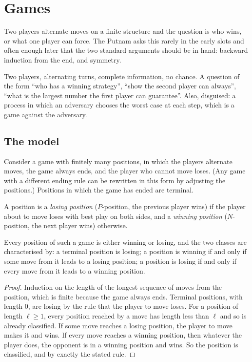 \section{Games}
\label{sec:games}

Two players alternate moves on a finite structure and the question is who wins, or what one player can force. The Putnam asks this rarely in the early slots and often enough later that the two standard arguments should be in hand: backward induction from the end, and symmetry.

\begin{recognise}
Two players, alternating turns, complete information, no chance. A question of the form ``who has a winning strategy'', ``show the second player can always'', ``what is the largest number the first player can guarantee''. Also, disguised: a process in which an adversary chooses the worst case at each step, which is a game against the adversary.
\end{recognise}

\subsection*{The model}

Consider a game with finitely many positions, in which the players alternate moves, the game always ends, and the player who cannot move loses. (Any game with a different ending rule can be rewritten in this form by adjusting the positions.) Positions in which the game has ended are terminal.

\begin{definition}
A position is a \emph{losing position} ($P$-position, the previous player wins) if the player about to move loses with best play on both sides, and a \emph{winning position} ($N$-position, the next player wins) otherwise.
\end{definition}

\begin{theorem}
Every position of such a game is either winning or losing, and the two classes are characterised by: a terminal position is losing; a position is winning if and only if some move from it leads to a losing position; a position is losing if and only if every move from it leads to a winning position.
\end{theorem}

\begin{proof}
Induction on the length of the longest sequence of moves from the position, which is finite because the game always ends. Terminal positions, with length $0$, are losing by the rule that the player to move loses. For a position of length $\ell \ge 1$, every position reached by a move has length less than $\ell$ and so is already classified. If some move reaches a losing position, the player to move makes it and wins. If every move reaches a winning position, then whatever the player does, the opponent is in a winning position and wins. So the position is classified, and by exactly the stated rule.
\end{proof}

